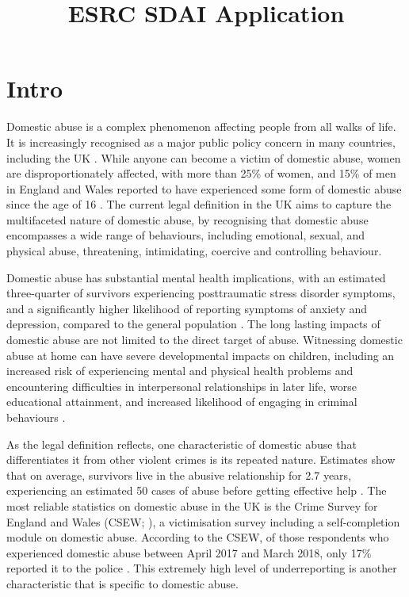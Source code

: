 \documentclass[11pt, a4paper]{article}
\begin{document}
\title{ESRC SDAI Application}
\date{}
\maketitle

\section{Intro}

Domestic abuse is a complex phenomenon affecting people from all walks of life. It is increasingly recognised as a major public policy concern in many countries, including the UK \cite{ep}. While anyone can become a victim of domestic abuse, women are disproportionately affected, with more than 25\% of women, and 15\% of men in England and Wales reported to have experienced some form of domestic abuse since the age of 16 \cite{ONS}.  The current legal definition in the UK \cite{govuk} aims to capture the multifaceted nature of domestic abuse, by recognising that domestic abuse encompasses a wide range of behaviours, including emotional, sexual, and physical abuse, threatening, intimidating, coercive and controlling behaviour. 

Domestic abuse has substantial mental health implications, with an estimated three-quarter of survivors experiencing posttraumatic stress disorder symptoms, and a significantly higher likelihood of reporting symptoms of anxiety and depression, compared to the general population \cite{ferrari}. The long lasting impacts of domestic abuse are not limited to the direct target of abuse. Witnessing domestic abuse at home can have severe developmental impacts on children, including an increased risk of experiencing mental and physical health problems and encountering difficulties in interpersonal relationships in later life, worse educational attainment, and increased likelihood of engaging in criminal behaviours \cite{callaghan}.

As the legal definition reflects, one characteristic of domestic abuse that differentiates it from other violent crimes is its repeated nature. Estimates show that on average, survivors live in the abusive relationship for 2.7 years, experiencing an estimated 50 cases of abuse before getting effective help \cite{SafeLives2015}. The most reliable statistics on domestic abuse in the UK is the Crime Survey for England and Wales (CSEW; ), a victimisation survey including a self-completion module on domestic abuse. According to the CSEW, of those respondents who experienced domestic abuse between April 2017 and March 2018, only 17\% reported it to the police \cite{ONS}. This extremely high level of underreporting is another characteristic that is specific to domestic abuse. 
\end{document}
